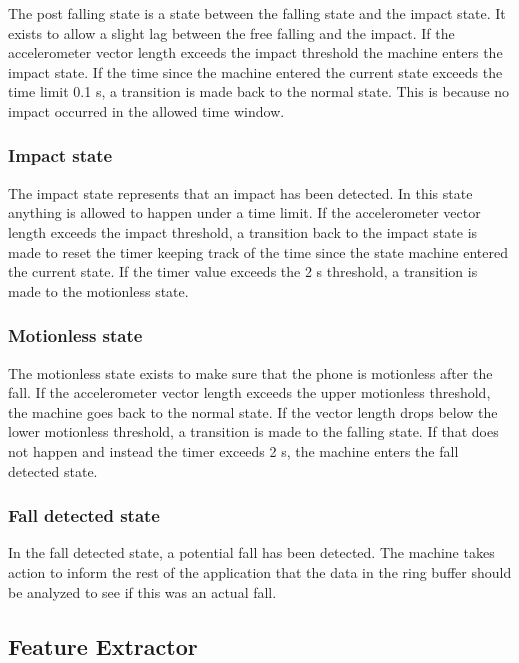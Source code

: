 \documentclass[12pt, a4paper, onecolumn]{article}
\begin{document}
	The post falling state is a state between the falling state and the impact state. It exists to allow a slight lag between the free falling and the impact. If the accelerometer vector length exceeds the impact threshold the machine enters the impact state. If the time since the machine entered the current state exceeds the time limit 0.1 s, a transition is made back to the normal state. This is because no impact occurred in the allowed time window.
	
	\subsubsection{Impact state}
	
	The impact state represents that an impact has been detected. In this state anything is allowed to happen under a time limit. If the accelerometer vector length exceeds the impact threshold, a transition back to the impact state is made to reset the timer keeping track of the time since the state machine entered the current state. If the timer value exceeds the 2 s threshold, a transition is made to the motionless state.
	
	\subsubsection{Motionless state}
	
	The motionless state exists to make sure that the phone is motionless after the fall. If the accelerometer vector length exceeds the upper motionless threshold, the machine goes back to the normal state. If the vector length drops below the lower motionless threshold, a transition is made to the falling state. If that does not happen and instead the timer exceeds 2 s, the machine enters the fall detected state.
	
	\subsubsection{Fall detected state}
	
	In the fall detected state, a potential fall has been detected. The machine takes action to inform the rest of the application that the data in the ring buffer should be analyzed to see if this was an actual fall.
	
	\subsection{Feature Extractor} \label{section:feature-extractor}
	
\end{document}
